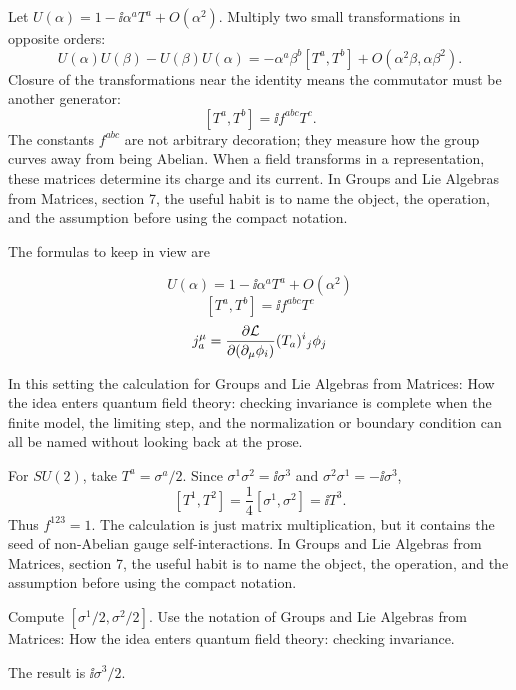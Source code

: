 Let \(U(\alpha)=1-\ii\alpha^aT^a+O(\alpha^2)\).  Multiply two small transformations in opposite orders:
\[
  U(\alpha)U(\beta)-U(\beta)U(\alpha)
  =
  -\alpha^a\beta^b[T^a,T^b]+O(\alpha^2\beta,\alpha\beta^2).
\]
Closure of the transformations near the identity means the commutator must be another generator:
\[
  [T^a,T^b]=\ii f^{abc}T^c.
\]
The constants \(f^{abc}\) are not arbitrary decoration; they measure how the group curves away from being Abelian.  When a field transforms in a representation, these matrices determine its charge and its current.  In Groups and Lie Algebras from Matrices, section 7, the useful habit is to name the object, the operation, and the assumption before using the compact notation.

The formulas to keep in view are

\[
  U(\alpha)=1-\ii\alpha^aT^a+O(\alpha^2)
\]
\[
  [T^a,T^b]=\ii f^{abc}T^c
\]
\[
  j^\mu_a=\frac{\partial\mathcal L}{\partial(\partial_\mu\phi_i)}(T_a)^i{}_j\phi_j
\]

In this setting the calculation for Groups and Lie Algebras from Matrices: How the idea enters quantum field theory: checking invariance is complete when the finite model, the limiting step, and the normalization or boundary condition can all be named without looking back at the prose.




\begin{example}
For \(SU(2)\), take \(T^a=\sigma^a/2\).  Since \(\sigma^1\sigma^2=\ii\sigma^3\) and \(\sigma^2\sigma^1=-\ii\sigma^3\),
\[
  [T^1,T^2]=\frac14[\sigma^1,\sigma^2]=\ii T^3.
\]
Thus \(f^{123}=1\).  The calculation is just matrix multiplication, but it contains the seed of non-Abelian gauge self-interactions.  In Groups and Lie Algebras from Matrices, section 7, the useful habit is to name the object, the operation, and the assumption before using the compact notation.
\end{example}



\begin{exercise}
Compute \([\sigma^1/2,\sigma^2/2]\).  Use the notation of Groups and Lie Algebras from Matrices: How the idea enters quantum field theory: checking invariance.
\begin{answer}
The result is \(\ii\sigma^3/2\).
\end{answer}
\end{exercise}

